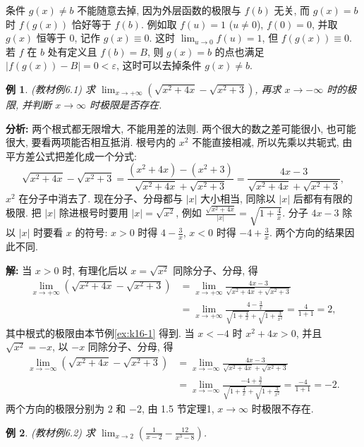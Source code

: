 \documentclass[UTF8,openany]{ctexbook}
\theoremstyle{chinesetextbook}
\newtheorem{example}{例}[section]
\newenvironment{cnsolution}{\par\indent\textbf{解:} \ignorespaces}{\par}
\begin{document}
条件 $g(x)\ne b$ 不能随意去掉, 因为外层函数的极限与 $f(b)$ 无关, 而 $g(x)=b$ 时 $f(g(x))$ 恰好等于 $f(b)$. 例如取 $f(u)=1$ ($u\ne0$), $f(0)=0$, 并取 $g(x)$ 恒等于 $0$, 记作 $g(x)\equiv0$. 这时 $\displaystyle\lim_{u\to0}f(u)=1$, 但 $f(g(x))\equiv0$. 若 $f$ 在 $b$ 处有定义且 $f(b)=B$, 则 $g(x)=b$ 的点也满足 $|f(g(x))-B|=0<\varepsilon$, 这时可以去掉条件 $g(x)\ne b$.
\begin{example}
\textnormal{(教材例6.1)} 求 $\displaystyle\lim_{x\to+\infty}\left(\sqrt{x^2+4x}-\sqrt{x^2+3}\right)$, 再求 $x\to-\infty$ 时的极限, 并判断 $x\to\infty$ 时极限是否存在.
\end{example}
\par\indent\textbf{分析:} 两个根式都无限增大, 不能用差的法则. 两个很大的数之差可能很小, 也可能很大, 要看两项能否相互抵消. 根号内的 $x^2$ 不能直接相减, 所以先乘以共轭式, 由平方差公式把差化成一个分式:
\[
\sqrt{x^2+4x}-\sqrt{x^2+3}=\frac{(x^2+4x)-(x^2+3)}{\sqrt{x^2+4x}+\sqrt{x^2+3}}=\frac{4x-3}{\sqrt{x^2+4x}+\sqrt{x^2+3}},
\]
$x^2$ 在分子中消去了. 现在分子、分母都与 $|x|$ 大小相当, 同除以 $|x|$ 后都有有限的极限. 把 $|x|$ 除进根号时要用 $|x|=\sqrt{x^2}$, 例如 $\displaystyle\frac{\sqrt{x^2+4x}}{|x|}=\sqrt{1+\frac4x}$. 分子 $4x-3$ 除以 $|x|$ 时要看 $x$ 的符号: $x>0$ 时得 $\displaystyle4-\frac3x$, $x<0$ 时得 $\displaystyle-4+\frac3x$. 两个方向的结果因此不同.
\begin{cnsolution}
当 $x>0$ 时, 有理化后以 $x=\sqrt{x^2}$ 同除分子、分母, 得
\[
\begin{aligned}
\lim_{x\to+\infty}\left(\sqrt{x^2+4x}-\sqrt{x^2+3}\right)
&=\lim_{x\to+\infty}\frac{4x-3}{\sqrt{x^2+4x}+\sqrt{x^2+3}}\\
&=\lim_{x\to+\infty}\frac{4-\frac3x}{\sqrt{1+\frac4x}+\sqrt{1+\frac3{x^2}}}=\frac4{1+1}=2,
\end{aligned}
\]
其中根式的极限由本节例\ref{ex:k16-1} 得到. 当 $x<-4$ 时 $x^2+4x>0$, 并且 $\sqrt{x^2}=-x$, 以 $-x$ 同除分子、分母, 得
\[
\begin{aligned}
\lim_{x\to-\infty}\left(\sqrt{x^2+4x}-\sqrt{x^2+3}\right)
&=\lim_{x\to-\infty}\frac{4x-3}{\sqrt{x^2+4x}+\sqrt{x^2+3}}\\
&=\lim_{x\to-\infty}\frac{-4+\frac3x}{\sqrt{1+\frac4x}+\sqrt{1+\frac3{x^2}}}=\frac{-4}{1+1}=-2.
\end{aligned}
\]
两个方向的极限分别为 $2$ 和 $-2$, 由 1.5 节定理1, $x\to\infty$ 时极限不存在.
\end{cnsolution}
\begin{example}\label{ex:6-2}
\textnormal{(教材例6.2)} 求 $\displaystyle\lim_{x\to2}\left(\frac1{x-2}-\frac{12}{x^3-8}\right)$.
\end{example}
\end{document}
